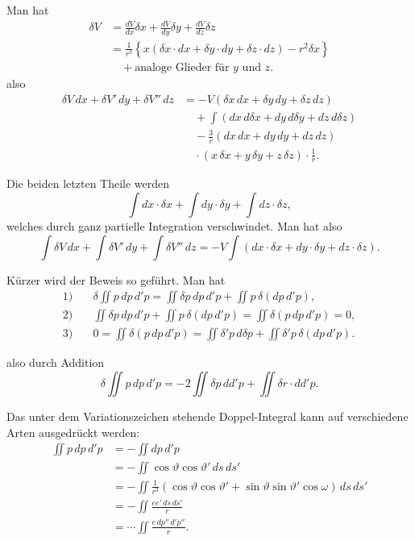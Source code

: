 \documentclass[fontsize=10pt,paper=a5,pagesize=auto]{scrbook}
\newcommand{\origpage}[1]{\marginpar{\footnotesize\textit{S. #1}}}
\begin{document}
Man hat
\begin{align*}
\delta V &= \frac{dV}{dx}\delta x + \frac{dV}{dy}\delta y + \frac{dV}{dz}\delta z\\
&= \frac{1}{r^3}\left\{x(\delta x \cdot dx + \delta y \cdot dy + \delta z \cdot dz) - r^2 \delta x\right\}\\
&\quad + \text{analoge Glieder für } y \text{ und } z.
\end{align*}
also
\begin{align*}
\delta V \, dx + \delta V' \, dy + \delta V'' \, dz &= -V(\delta x \, dx + \delta y \, dy + \delta z \, dz)\\
&\quad + \int(dx \, d\delta x + dy \, d\delta y + dz \, d\delta z)\\
&\quad - \frac{3}{r}(dx \, dx + dy \, dy + dz \, dz)\\
&\quad \cdot (x \, \delta x + y \, \delta y + z \, \delta z) \cdot \frac{1}{r}.
\end{align*}

\begin{otherlanguage}{ngerman}
Die beiden letzten Theile werden
\[
\int dx \cdot \delta x + \int dy \cdot \delta y + \int dz \cdot \delta z,
\]
welches durch ganz partielle Integration verschwindet. Man hat also
\[
\int \delta V \, dx + \int \delta V' \, dy + \int \delta V'' \, dz = -V \int(dx \cdot \delta x + dy \cdot \delta y + dz \cdot \delta z).
\]

Kürzer wird der Beweis so geführt. Man hat
\begin{align*}
\text{1)} \quad &\delta \iint p \, dp \, d'p = \iint \delta p \, dp \, d'p + \iint p \, \delta(dp \, d'p),\\
\text{2)} \quad &\iint \delta p \, dp \, d'p + \iint p \, \delta(dp \, d'p) = \iint \delta(p \, dp \, d'p) = 0,\\
\text{3)} \quad &0 = \iint \delta(p \, dp \, d'p) = \iint \delta'p \, d\delta p + \iint \delta'p \, \delta(dp \, d'p).
\end{align*}
\end{otherlanguage}

\origpage{615}
also durch Addition
\[
\delta \iint p \, dp \, d'p = -2\iint \delta p \, dd'p + \iint \delta r \cdot dd'p.
\]

Das unter dem Variationszeichen stehende Doppel-Integral kann auf verschiedene Arten ausgedrückt werden:
\begin{align*}
\iint p \, dp \, d'p &= -\iint dp \, d'p\\
&= -\iint \cos\vartheta \cos\vartheta' \, ds \, ds'\\
&= -\iint \frac{1}{r^3}(\cos\vartheta \cos\vartheta' + \sin\vartheta \sin\vartheta' \cos\omega) \, ds \, ds'\\
&= -\iint \frac{ee' \, ds \, ds'}{r}\\
&= \cdots \iint \frac{e \, dp'' \, d'p''}{r}.
\end{align*}
\end{document}
